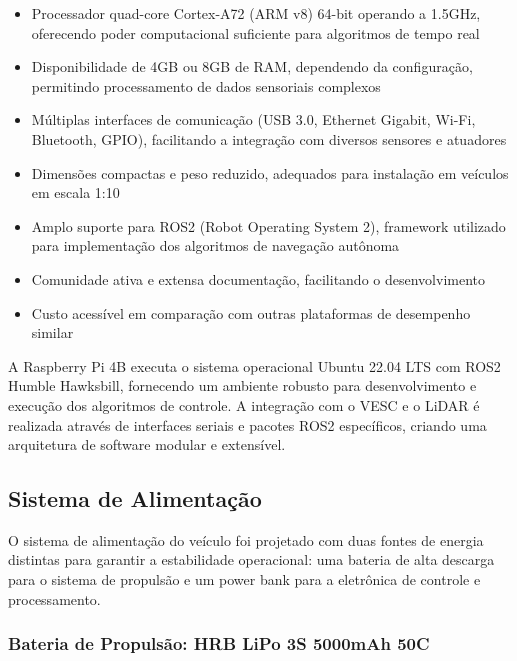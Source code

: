 \begin{itemize}
      \item Processador quad-core Cortex-A72 (ARM v8) 64-bit operando a 1.5GHz, oferecendo
            poder computacional suficiente para algoritmos de tempo real
      \item Disponibilidade de 4GB ou 8GB de RAM, dependendo da configuração, permitindo
            processamento de dados sensoriais complexos
      \item Múltiplas interfaces de comunicação (USB 3.0, Ethernet Gigabit, Wi-Fi,
            Bluetooth, GPIO), facilitando a integração com diversos sensores e atuadores
      \item Dimensões compactas e peso reduzido, adequados para instalação em veículos em
            escala 1:10
      \item Amplo suporte para ROS2 (Robot Operating System 2), framework utilizado para
            implementação dos algoritmos de navegação autônoma
      \item Comunidade ativa e extensa documentação, facilitando o desenvolvimento
      \item Custo acessível em comparação com outras plataformas de desempenho similar
\end{itemize}

A Raspberry Pi 4B executa o sistema operacional Ubuntu 22.04 LTS com ROS2
Humble Hawksbill, fornecendo um ambiente robusto para desenvolvimento e
execução dos algoritmos de controle. A integração com o VESC e o LiDAR é
realizada através de interfaces seriais e pacotes ROS2 específicos, criando uma
arquitetura de software modular e extensível.

\subsection{Sistema de Alimentação}

O sistema de alimentação do veículo foi projetado com duas fontes de energia
distintas para garantir a estabilidade operacional: uma bateria de alta
descarga para o sistema de propulsão e um power bank para a eletrônica de
controle e processamento.

\subsubsection{Bateria de Propulsão: HRB LiPo 3S 5000mAh 50C}

